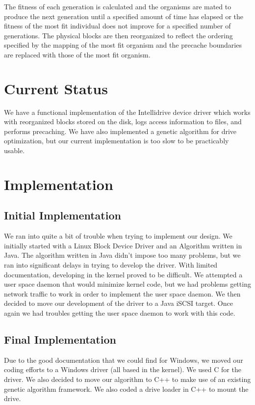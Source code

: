 \documentclass[letterpaper,twocolumn,10pt]{article}
\begin{document}
The fitness of each generation is calculated and the organisms are mated to produce the next generation until a specified amount of time has elapsed or the fitness of the most fit individual does not improve for a specified number of generations.  The physical blocks are then reorganized to reflect the ordering specified by the mapping of the most fit organism and the precache boundaries are replaced with those of the most fit organism.

\section{Current Status}

We have a functional implementation of the Intellidrive device driver which works with reorganized blocks stored on the disk, logs access information to files, and performs precaching.  We have also implemented a genetic algorithm for drive optimization, but our current implementation is too slow to be practicably usable.

\section{Implementation}
\subsection{Initial Implementation}
We ran into quite a bit of trouble when trying to implement our design.  We initially started with a Linux Block Device Driver and an Algorithm written in Java.  The algorithm written in Java didn't impose too many problems, but we ran into significant delays in trying to develop the driver.  With limited documentation, developing in the kernel proved to be difficult.  We attempted a user space daemon that would minimize kernel code, but we had problems getting network traffic to work in order to implement the user space daemon.  We then decided to move our development of the driver to a Java iSCSI target.  Once again we had troubles getting the user space daemon to work with this code.

\subsection{Final Implementation}
Due to the good documentation that we could find for Windows, we moved our coding efforts to a Windows driver (all based in the kernel).  We used C for the driver.  We also decided to move our algorithm to C++ to make use of an existing genetic algorithm framework.  We also coded a drive loader in C++ to mount the drive.
\end{document}
